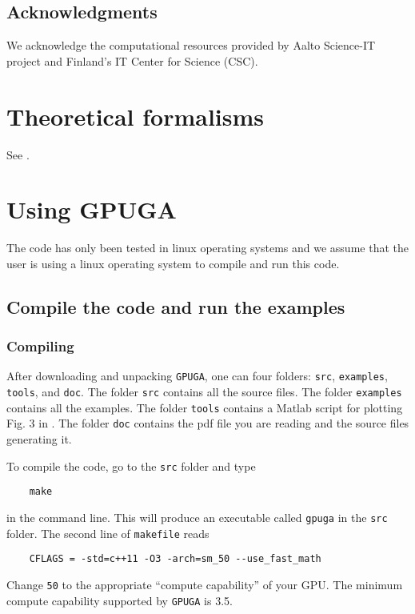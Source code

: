 \documentclass[12pt,a4paper]{report}
\begin{document}
\section{Acknowledgments}
We acknowledge the computational resources provided by Aalto Science-IT project and Finland's IT Center for Science (CSC).

\chapter{Theoretical formalisms\label{section:theory}}

See \cite{fan2019arxiv}. 

\chapter{Using GPUGA \label{section:usage}}

The code has only been tested in linux operating systems and we assume that the user is using a linux operating system to compile and run this code.

\section{Compile the code and run the examples}

\subsection{Compiling}

After downloading and unpacking \verb"GPUGA", one can four folders:  \verb"src",  \verb"examples",  \verb"tools", and \verb"doc". The folder \verb"src" contains all the source files. The folder \verb"examples" contains all the examples. The folder \verb"tools" contains a Matlab script for plotting Fig. 3 in \cite{fan2019arxiv}. The folder \verb"doc" contains the pdf file you are reading and the source files generating it.

To compile the code, go to the \verb"src" folder and type
\begin{verbatim}
    make
\end{verbatim}
in the command line. This will produce an executable called \verb"gpuga" in the \verb"src" folder. The second line of \verb"makefile" reads
\begin{verbatim}
    CFLAGS = -std=c++11 -O3 -arch=sm_50 --use_fast_math
\end{verbatim}
Change \verb"50" to the appropriate ``compute capability'' of your GPU. The minimum compute capability supported by \verb"GPUGA" is 3.5.
\end{document}
